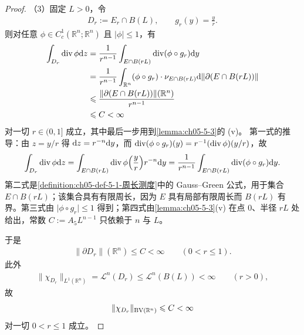 \documentclass[../../main.tex]{subfiles}%
\begin{document}
\begin{proof}
（3）固定 $L>0$，令
\begin{align*}
D_r:=E_r\cap B(L),\qquad g_r(y)=\frac{y}{r}.
\end{align*}
则对任意 $\phi\in C_c^1(\mathbb{R}^n;\mathbb{R}^n)$ 且 $\lvert\phi\rvert\leqslant1$，有
\begin{align*}
\int_{D_r}\operatorname{div}\phi\mathrm{d} z
&=\frac{1}{r^{n-1}}\int_{E\cap B(rL)}\operatorname{div}(\phi\circ g_r)\mathrm{d} y\\
&=\frac{1}{r^{n-1}}\int_{\mathbb{R}^n}(\phi\circ g_r)\cdot\nu_{E\cap B(rL)}\mathrm{d}\lVert\partial(E\cap B(rL))\rVert\\
&\leqslant\frac{\lVert\partial(E\cap B(rL))\rVert(\mathbb{R}^n)}{r^{n-1}}\\
&\leqslant C<\infty
\end{align*}
对一切 $r\in(0,1]$ 成立，其中最后一步用到\cref{lemma:ch05-5-3}的 (v)。%
第一式的推导：由 $z=y/r$ 得 $\mathrm{d} z=r^{-n}\mathrm{d} y$，而 $\operatorname{div}(\phi\circ g_r)(y)=r^{-1}(\operatorname{div}\phi)(y/r)$，故
\begin{align*}
\int_{D_r}\operatorname{div}\phi\mathrm{d} z=\int_{E\cap B(rL)}\operatorname{div}\phi\Bigl(\frac{y}{r}\Bigr)r^{-n}\mathrm{d} y=\frac{1}{r^{n-1}}\int_{E\cap B(rL)}\operatorname{div}(\phi\circ g_r)\mathrm{d} y .
\end{align*}
第二式是\cref{definition:ch05-def-5-1-周长测度}中的 Gauss--Green 公式，用于集合 $E\cap B(rL)$；该集合具有有限周长，因为 $E$ 具有局部有限周长而 $B(rL)$ 有界。第三式由 $\lvert\phi\circ g_r\rvert\leqslant1$ 得到；第四式由\cref{lemma:ch05-5-3}(v) 在点 $0$、半径 $rL$ 处给出，常数 $C:=A_5L^{n-1}$ 只依赖于 $n$ 与 $L$。%

于是
\begin{align*}
\lVert\partial D_r\rVert(\mathbb{R}^n)\leqslant C<\infty\qquad(0<r\leqslant1).
\end{align*}
此外
\begin{align*}
\lVert\chi_{D_r}\rVert_{L^1(\mathbb{R}^n)}=\mathcal{L}^n(D_r)\leqslant\mathcal{L}^n(B(L))<\infty\qquad(r>0),
\end{align*}
故
\begin{align*}
\lVert\chi_{D_r}\rVert_{\mathrm{BV}(\mathbb{R}^n)}\leqslant C<\infty
\end{align*}
对一切 $0<r\leqslant1$ 成立。


\end{proof}
\end{document}
